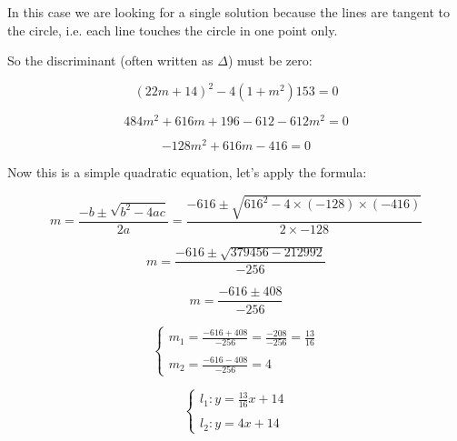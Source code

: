 In this case we are looking for a single solution because the lines are tangent to the circle, i.e. each line touches the circle in one point only.

So the discriminant (often written as $\Delta$) must be zero:

\begin{equation*}
(22m+14)^2-4(1+m^2)153=0
\end{equation*}

\begin{equation*}
484m^2+616m+196-612-612m^2=0
\end{equation*}

\begin{equation*}
-128m^2+616m-416=0
\end{equation*}

Now this is a simple quadratic equation, let's apply the formula:

\begin{equation*}
m=\frac{-b\pm\sqrt{b^2-4ac}}{2a}=\frac{-616\pm \sqrt{616^2-4\times(-128)\times(-416)}}{2\times -128}
\end{equation*}


\begin{equation*}
m=\frac{-616\pm \sqrt{379456-212992}}{-256}
\end{equation*}


\begin{equation*}
m=\frac{-616\pm 408}{-256}
\end{equation*}

\begin{equation*}
\left\{
\begin{array}{ll}
m_1=\frac{-616+408}{-256}=\frac{-208}{-256}=\frac{13}{16}\\
\\
m_2=\frac{-616-408}{-256}=4
\end{array}
\right.
\end{equation*}

\begin{equation*}
\left\{
\begin{array}{ll}
l_1: y=\frac{13}{16}x+14\\
\\
l_2: y=4x+14
\end{array}
\right.
\end{equation*}

